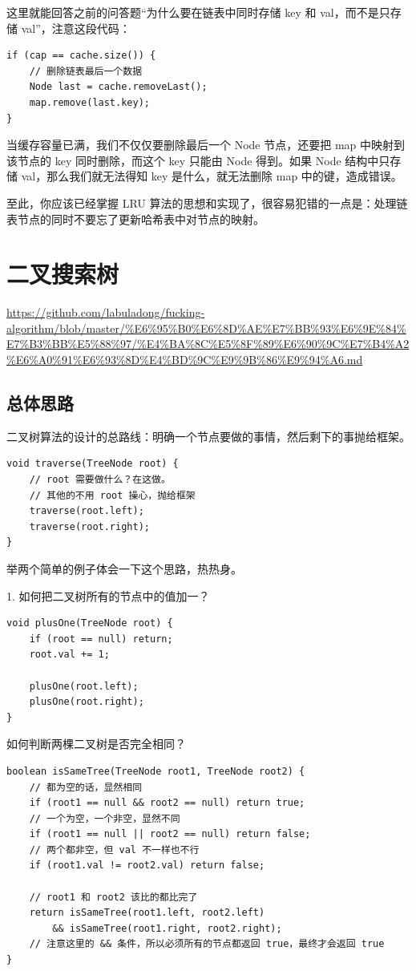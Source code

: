 \documentclass[12pt]{article}
\begin{document}
这里就能回答之前的问答题“为什么要在链表中同时存储 key 和 val，而不是只存储 val”，注意这段代码：
\begin{lstlisting}
if (cap == cache.size()) {
    // 删除链表最后一个数据
    Node last = cache.removeLast();
    map.remove(last.key);
}
\end{lstlisting}
当缓存容量已满，我们不仅仅要删除最后一个 Node 节点，还要把 map 中映射到该节点的 key 同时删除，而这个 key 只能由 Node 得到。如果 Node 结构中只存储 val，那么我们就无法得知 key 是什么，就无法删除 map 中的键，造成错误。

至此，你应该已经掌握 LRU 算法的思想和实现了，很容易犯错的一点是：处理链表节点的同时不要忘了更新哈希表中对节点的映射。

\section{二叉搜索树}
\url{https://github.com/labuladong/fucking-algorithm/blob/master/%E6%95%B0%E6%8D%AE%E7%BB%93%E6%9E%84%E7%B3%BB%E5%88%97/%E4%BA%8C%E5%8F%89%E6%90%9C%E7%B4%A2%E6%A0%91%E6%93%8D%E4%BD%9C%E9%9B%86%E9%94%A6.md}
\subsection{总体思路}
二叉树算法的设计的总路线：明确一个节点要做的事情，然后剩下的事抛给框架。
\begin{lstlisting}
void traverse(TreeNode root) {
    // root 需要做什么？在这做。
    // 其他的不用 root 操心，抛给框架
    traverse(root.left);
    traverse(root.right);
}
\end{lstlisting}

举两个简单的例子体会一下这个思路，热热身。

1. 如何把二叉树所有的节点中的值加一？
\begin{lstlisting}
void plusOne(TreeNode root) {
    if (root == null) return;
    root.val += 1;

    plusOne(root.left);
    plusOne(root.right);
}
\end{lstlisting}

如何判断两棵二叉树是否完全相同？
\begin{lstlisting}
boolean isSameTree(TreeNode root1, TreeNode root2) {
    // 都为空的话，显然相同
    if (root1 == null && root2 == null) return true;
    // 一个为空，一个非空，显然不同
    if (root1 == null || root2 == null) return false;
    // 两个都非空，但 val 不一样也不行
    if (root1.val != root2.val) return false;

    // root1 和 root2 该比的都比完了
    return isSameTree(root1.left, root2.left)
        && isSameTree(root1.right, root2.right);
    // 注意这里的 && 条件，所以必须所有的节点都返回 true，最终才会返回 true
}
\end{lstlisting}
\end{document}
